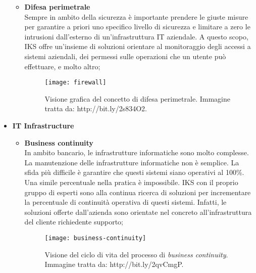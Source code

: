 \begin{itemize}
\begin{itemize}
	 	\item \textbf{Difesa perimetrale}\\ 
	 	Sempre in ambito della sicurezza è importante prendere le 
		giuste misure per garantire a priori uno specifico livello 
		di sicurezza e limitare a zero le intrusioni dall'esterno 
	 	di un'infrastruttura IT aziendale. A questo scopo, IKS offre 
		un'insieme di soluzioni orientare al monitoraggio degli 
		accessi a sistemi aziendali, dei permessi sulle operazioni 
	 	che un utente può effettuare, e molto altro;
	 	\begin{figure}[htbp]
	 		\begin{center}
	 			\texttt{[image: firewall]}
	 			\caption{Visione grafica del concetto di difesa 
				perimetrale. Immagine tratta da: 
				http://bit.ly/2s834O2.}
	 		\end{center}
	 	\end{figure}	 	
	 \end{itemize}	
	\item \textbf{IT Infrastructure}\\
	 \begin{itemize}
	 	\item \textbf{Business continuity}\\
	 	In ambito bancario, le infrastrutture informatiche sono molto 
		complesse. La manutenzione delle infrastrutture informatiche non è 
		semplice. La sfida più difficile è garantire che questi sistemi siano 
		operativi al 100\%. Una simile percentuale nella pratica è 
		impossibile. IKS con il proprio gruppo di esperti sono alla 
		continua ricerca di soluzioni per incrementare la percentuale 
		di continuità operativa di questi sistemi. Infatti, le 
		soluzioni offerte dall'azienda sono orientate nel concreto 
		all'infrastruttura del cliente richiedente supporto;
	 	\begin{figure}[htbp]
	 		\begin{center}
	 		\texttt{[image: business-continuity]}
				\caption{Visione del ciclo di vita del 
				processo di \emph{business continuity}. 
				Immagine tratta da: http://bit.ly/2qvCmgP.}
			\end{center}
			\end{figure}


\end{itemize}
\end{itemize}
